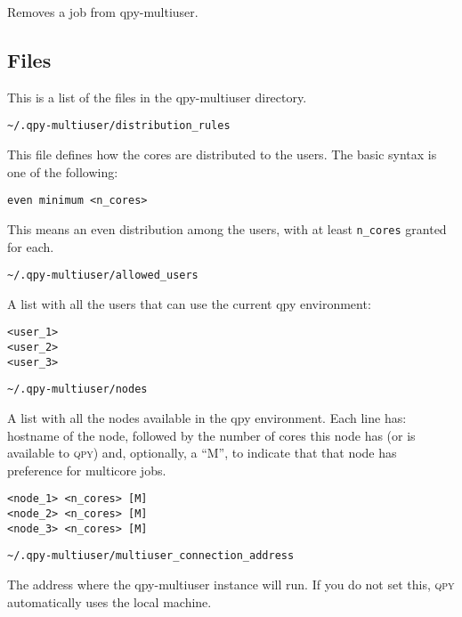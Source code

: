 \documentclass[a4paper,12pt]{article}
\newcommand{\qpy}{\textsc{qpy}}
\begin{document}
Removes a job from qpy-multiuser.



\subsection{Files}\label{sec:files_admin}

This is a list of the files in the qpy-multiuser directory.

\begin{verbatim}
~/.qpy-multiuser/distribution_rules
\end{verbatim}

This file defines how the cores are distributed to the users.
The basic syntax is one of the following:

\begin{lstlisting}[style=FileStyle]
even minimum <n_cores>
\end{lstlisting}

This means an even distribution among the users, with at least \texttt{n\_cores} granted for each.

\begin{verbatim}
~/.qpy-multiuser/allowed_users
\end{verbatim}

A list with all the users that can use the current qpy environment:

\begin{lstlisting}[style=FileStyle]
<user_1>
<user_2>
<user_3>
\end{lstlisting}

\begin{verbatim}
~/.qpy-multiuser/nodes
\end{verbatim}

A list with all the nodes available in the qpy environment.
Each line has: hostname of the node, followed by the number of cores this node has (or is available to \qpy{}) and, optionally, a ``M'', to indicate that that node has preference for multicore jobs.

\begin{lstlisting}[style=FileStyle]
<node_1> <n_cores> [M]
<node_2> <n_cores> [M]
<node_3> <n_cores> [M]
\end{lstlisting}

\begin{verbatim}
~/.qpy-multiuser/multiuser_connection_address
\end{verbatim}

The address where the qpy-multiuser instance will run.
If you do not set this, \qpy{} automatically uses the local machine.
\end{document}
